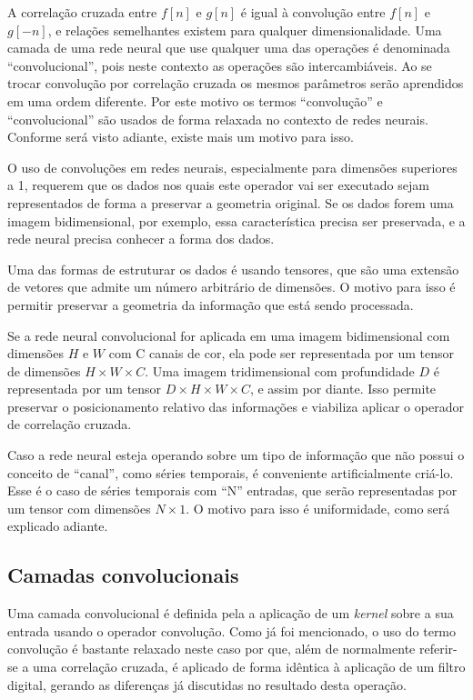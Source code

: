 A correlação cruzada entre $f[n]$ e $g[n]$
é igual à convolução entre $f[n]$ e $g[-n]$, e relações semelhantes existem
para qualquer dimensionalidade. Uma camada de uma rede
neural que use qualquer uma das operações é denominada “convolucional”,
pois neste contexto as operações são intercambiáveis. Ao se trocar convolução
por correlação
cruzada os mesmos parâmetros serão aprendidos em uma ordem diferente.
Por este motivo os termos ``convolução'' e ``convolucional'' são usados de forma
relaxada no contexto de redes neurais. Conforme será visto adiante, existe
mais um motivo para isso.

O uso de convoluções em redes neurais, especialmente para dimensões superiores
a 1, requerem que os dados nos quais este operador vai ser executado sejam
representados de forma a preservar a geometria original. Se os dados forem uma
imagem bidimensional, por exemplo, essa característica precisa ser preservada,
e a rede neural precisa conhecer a forma dos dados.

Uma das formas de estruturar os dados é usando tensores, que são uma
extensão de
vetores que admite um número arbitrário de dimensões. O motivo para isso é
permitir preservar a geometria da informação que está sendo processada.

Se a rede neural convolucional for aplicada em uma
imagem bidimensional com dimensões $H$ e $W$ com C canais de cor, ela pode ser
representada por um tensor de dimensões $H \times W \times C$. Uma imagem
tridimensional com profundidade $D$ é representada por um tensor
$D \times H \times W \times C$, e assim por
diante. Isso permite preservar o posicionamento relativo das informações
e viabiliza aplicar o operador de correlação cruzada.

Caso a rede neural esteja operando sobre um tipo de informação que não possui o
conceito de “canal”, como séries temporais, é conveniente artificialmente
criá-lo. Esse é o caso de séries temporais com “N” entradas, que serão
representadas por um tensor com dimensões $N\times1$. O motivo para isso é
uniformidade, como será explicado adiante.

\subsection{Camadas convolucionais}
Uma camada convolucional é definida pela a aplicação de um \emph{kernel} sobre
a sua entrada usando o operador convolução. Como já foi mencionado,
o uso do termo convolução
é bastante relaxado neste caso por que, além de normalmente referir-se a
uma correlação cruzada, é aplicado de forma idêntica à aplicação de um filtro
digital, gerando as diferenças já discutidas no resultado desta operação.

